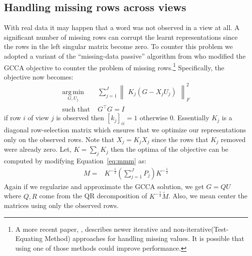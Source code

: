 \documentclass[11pt]{article}
\begin{document}
\subsection{Handling missing rows across views}
\label{ssec:missing}
With real data it may happen that a word was not observed in a view at
all. A significant number of 
missing rows can corrupt the learnt representations since the rows
in the left singular matrix become zero.
To counter this problem we adopted a variant of the ``missing-data
passive'' algorithm from \cite{van2006generalized} who modified the
GCCA objective to counter the problem of missing 
rows.\footnote{A more recent paper, \cite{van2012generalized},
  describes newer iterative and non-iterative(Test-Equating Method)
  approaches for handling missing values. It is possible that using
  one of those methods could improve performance.}
Specifically, the objective now becomes:
\begin{equation}
  \label{eq:gcca2}
\begin{split}
  \operatorname*{arg\,min}_{G,U_j} & \sum_{j=1}^J \begin{Vmatrix} K_j(G - X_jU_j) \end{Vmatrix}^2_F \\
  \text{such that } & G^\top G = I
\end{split}
\end{equation}
if row $i$ of view $j$ is observed then $[k_j]_{ii} = 1$ otherwise $0$.
Essentially $K_j$ is a diagonal row-selection matrix which ensures
that we optimize our representations only on the observed rows. Note that
$X_j = K_jX_j$ since the rows that $K_j$ removed were already
zero. Let, $K =
\sum_j K_j$ then the optima
of the objective can be computed by modifying Equation~\ref{eq:mmm} as:
\begin{align}
  M =& K^{-\frac{1}{2}}(\sum_{j=1}^J P_j)K^{-\frac{1}{2}}
\end{align}
Again if we regularize and approximate the GCCA solution, we get
$G=QU$ where $Q, R$ come from the QR decomposition of
$K^{-\frac{1}{2}}\tilde{M}$. Also, we mean center the matrices using
only the observed rows.
\end{document}
